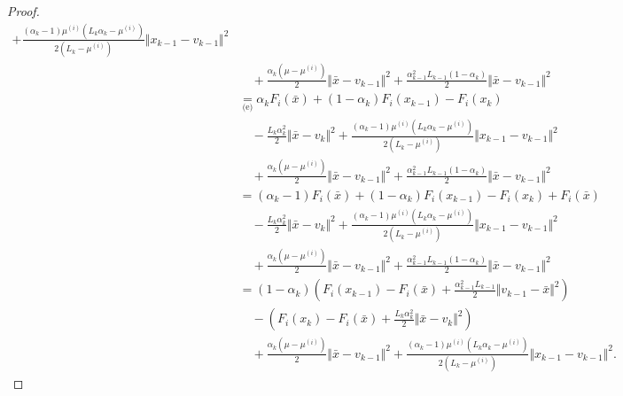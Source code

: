 \documentclass[12pt]{article}
\begin{document}
\begin{proof}
{\begin{align*}
                    + \frac{(\alpha_k - 1)\mu^{(i)}\left(L_k\alpha_k - \mu^{(i)}\right)}{2\left(L_k - \mu^{(i)}\right)}
                    \Vert x_{k - 1} - v_{k - 1} \Vert^2
                    \\ &\quad 
                    + \frac{\alpha_k(\mu - \mu^{(i)})}{2} \Vert \bar x - v_{k - 1}\Vert^2
                    + \frac{\alpha_{k - 1}^2L_{k - 1}(1 - \alpha_k)}{2} \Vert \bar x - v_{k - 1}\Vert^2
                \\
                &\underset{\text{(e)}}{=} 
                \alpha_k F_i(\bar x) + (1 - \alpha_k)F_i(x_{k - 1}) - F_i(x_k) 
                    \\&\quad 
                    - \frac{L_k\alpha_k^2}{2}\Vert \bar x - v_k\Vert^2 
                    + \frac{(\alpha_k - 1)\mu^{(i)}\left(L_k\alpha_k - \mu^{(i)}\right)}{2\left(L_k - \mu^{(i)}\right)}
                    \Vert x_{k - 1} - v_{k - 1} \Vert^2
                    \\ &\quad 
                    + \frac{\alpha_k(\mu - \mu^{(i)})}{2} \Vert \bar x - v_{k - 1}\Vert^2
                    + \frac{\alpha_{k - 1}^2L_{k - 1}(1 - \alpha_k)}{2} \Vert \bar x - v_{k - 1}\Vert^2
                \\
                &= (\alpha_k - 1)F_i(\bar x) + (1 - \alpha_k)F_i(x_{k - 1}) - F_i(x_k) + F_i(\bar x)
                    \\&\quad 
                    - \frac{L_k\alpha_k^2}{2}\Vert \bar x - v_k\Vert^2 
                    + \frac{(\alpha_k - 1)\mu^{(i)}\left(L_k\alpha_k - \mu^{(i)}\right)}{2\left(L_k - \mu^{(i)}\right)}\Vert x_{k - 1} - v_{k - 1} \Vert^2
                    \\ &\quad 
                    + \frac{\alpha_k(\mu - \mu^{(i)})}{2} \Vert \bar x - v_{k - 1}\Vert^2
                    + \frac{\alpha_{k - 1}^2L_{k - 1}(1 - \alpha_k)}{2} \Vert \bar x - v_{k - 1}\Vert^2
                \\
                &= (1 - \alpha_k)\left(
                    F_i(x_{k - 1}) - F_i(\bar x) + \frac{\alpha_{k - 1}^2L_{k - 1}}{2}\Vert v_{k - 1} - \bar x\Vert^2
                \right) 
                    \\ & \quad
                    - \left(
                        F_i(x_{k}) - F_i(\bar x) + \frac{L_k\alpha_k^2}{2}\Vert \bar x - v_k\Vert^2 
                    \right)
                    \\ &\quad 
                    + \frac{\alpha_k(\mu - \mu^{(i)})}{2}\Vert \bar x - v_{k - 1}\Vert^2
                    + \frac{(\alpha_k - 1)\mu^{(i)}\left(L_k\alpha_k - \mu^{(i)}\right)}{2\left(L_k - \mu^{(i)}\right)}\Vert x_{k - 1} - v_{k - 1} \Vert^2. 

\end{align*}}
\end{proof}
\end{document}
